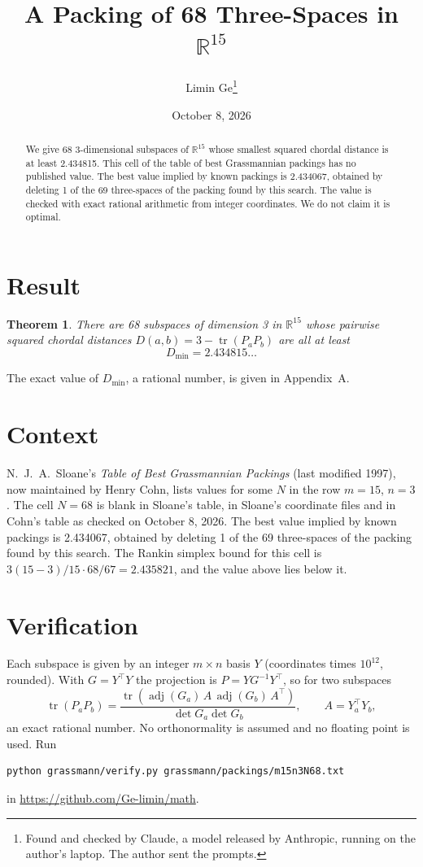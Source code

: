\documentclass[11pt,a4paper]{article}
\title{A Packing of 68 Three-Spaces in $\mathbb{R}^{15}$}
\author{Limin Ge\thanks{Found and checked by Claude, a model released by Anthropic, running on the author's laptop. The author sent the prompts.}}
\date{October 8, 2026}
\newtheorem*{theorem}{Theorem}
\begin{document}
\maketitle
\begin{abstract}
We give 68 3-dimensional subspaces of $\mathbb{R}^{15}$ whose smallest squared chordal distance is at least 2.434815. This cell of the table of best Grassmannian packings has no published value. The best value implied by known packings is 2.434067, obtained by deleting 1 of the 69 three-spaces of the packing found by this search. The value is checked with exact rational arithmetic from integer coordinates. We do not claim it is optimal.
\end{abstract}

\section{Result}
\begin{theorem}
There are 68 subspaces of dimension 3 in $\mathbb{R}^{15}$ whose pairwise squared chordal distances $D(a,b) = 3 - \operatorname{tr}(P_aP_b)$ are all at least
\[ D_{\min} = 2.434815\ldots \]
\end{theorem}
The exact value of $D_{\min}$, a rational number, is given in Appendix~A.


\section{Context}
N.~J.~A.~Sloane's \emph{Table of Best Grassmannian Packings} (last modified 1997), now maintained by Henry Cohn, lists values for some $N$ in the row $m=15$, $n=3$. The cell $N=68$ is blank in Sloane's table, in Sloane's coordinate files and in Cohn's table as checked on October 8, 2026. The best value implied by known packings is 2.434067, obtained by deleting 1 of the 69 three-spaces of the packing found by this search. The Rankin simplex bound for this cell is $3(15-3)/15\cdot 68/67 = 2.435821$, and the value above lies below it.


\section{Verification}
Each subspace is given by an integer $m\times n$ basis $Y$ (coordinates times $10^{12}$, rounded). With $G=Y^\top Y$ the projection is $P=YG^{-1}Y^\top$, so for two subspaces
\[ \operatorname{tr}(P_aP_b)=\frac{\operatorname{tr}(\operatorname{adj}(G_a)\,A\,\operatorname{adj}(G_b)\,A^\top)}{\det G_a\det G_b},\qquad A=Y_a^\top Y_b, \]
an exact rational number. No orthonormality is assumed and no floating point is used. Run
\begin{verbatim}
python grassmann/verify.py grassmann/packings/m15n3N68.txt
\end{verbatim}
in \url{https://github.com/Ge-limin/math}.
\end{document}
